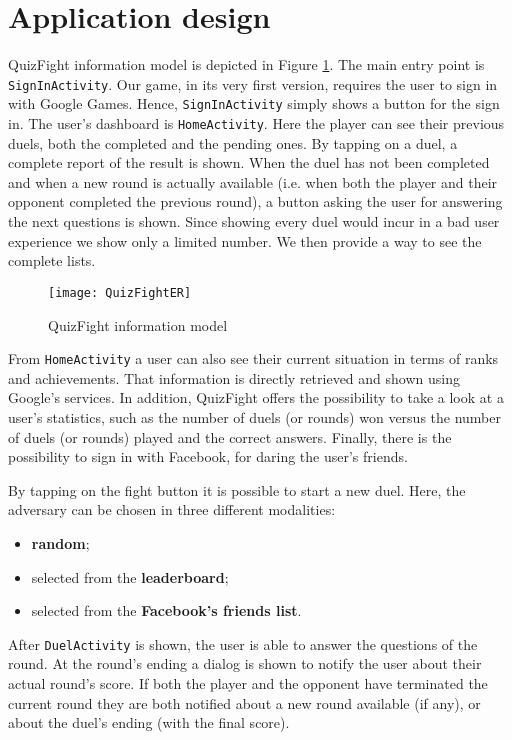 \section{Application design}\label{ref:design}

QuizFight information model is depicted in Figure \ref{fig:quizfighter}.
The main entry point is \texttt{SignInActivity}.
Our game, in its very first version, requires the user to sign in with Google
Games. Hence, \texttt{SignInActivity} simply shows a button for the sign in.
The user's dashboard is \texttt{HomeActivity}.
Here the player can see their previous duels, both the completed and the
pending ones.
By tapping on a duel, a complete report of the result is shown.
When the duel has not been completed and when a new round is actually
available (i.e. when both the player and their opponent completed the
previous round), a button asking the user for answering the next questions
is shown.
Since showing every duel would incur in a bad user experience we show
only a limited number. We then provide a way to see the complete lists.

\begin{figure}[t]
	\centering
	\texttt{[image: QuizFightER]}
	\caption{QuizFight information model}
	\label{fig:quizfighter}
\end{figure}

From \texttt{HomeActivity} a user can also see their current situation in terms
of ranks and achievements.
That information is directly retrieved and shown using Google's services.
In addition, QuizFight offers the possibility to take a look at a user's
statistics, such as the number of duels (or rounds) won versus the number of
duels (or rounds) played and the correct answers.
Finally, there is the possibility to sign in with Facebook, for daring the
user's friends.

By tapping on the fight button it is possible to start a new duel.
Here, the adversary can be chosen in three different modalities:

\begin{itemize}
	\item \textbf{random};
	\item selected from the \textbf{leaderboard};
	\item selected from the \textbf{Facebook's friends list}.
\end{itemize}

After \texttt{DuelActivity} is shown, the user is able to answer the
questions of the round. At the round's ending a dialog is shown to notify 
the user about their actual round's score. If both the player and the opponent 
have terminated the current round they are both notified about a new round 
available (if any), or about the duel's ending (with the final score). 
